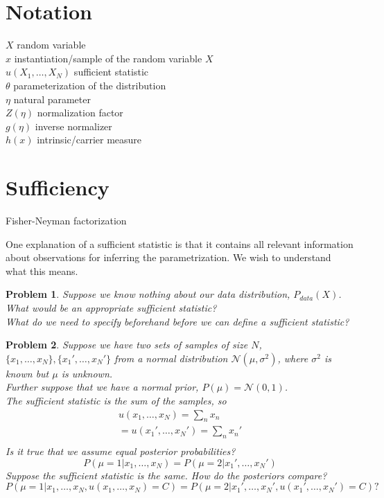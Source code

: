 \documentclass[a4paper]{article}
\newtheorem{problem}{Problem}[section]
\begin{document}
\section{Notation}

$X$ random variable \\ 
$x$ instantiation/sample of the random variable $X$ \\
$u(X_1, \ldots, X_N)$ sufficient statistic \\
$\theta$ parameterization of the distribution \\
$\eta$ natural parameter \\
$Z(\eta)$ normalization factor \\
$g(\eta)$ inverse normalizer \\
$h(x)$ intrinsic/carrier measure

\section{Sufficiency}

Fisher-Neyman factorization

One explanation of a sufficient statistic is that it contains all relevant information about observations for inferring the parametrization.  We wish to understand what this means.

\begin{problem}
Suppose we know nothing about our data distribution, $P_{data}(X)$.  What would be an appropriate sufficient statistic?  \\
What do we need to specify beforehand before we can define a sufficient statistic?  
\end{problem}

\begin{problem}
  Suppose we have two sets of samples of size $N$, $\{x_1,\ldots,x_N\},\{x_1',\ldots,x_N'\}$ from a normal distribution $\mathcal{N}( \mu, \sigma^2 )$, where $\sigma^2$ is known but $\mu$ is unknown.  \\
  Further suppose that we have a normal prior, $P(\mu) = \mathcal{N}(0,1)$.  \\
  The sufficient statistic is the sum of the samples, so 
\begin{equation}
  \begin{split}
    u(x_1,\ldots,x_N) = \sum_n x_n \\
    = u(x_1',\ldots,x_N') = \sum_n x_n' \\
  \end{split}
  \label{}
\end{equation}
Is it true that we assume equal posterior probabilities?
\begin{equation}
  P( \mu = 1 \vert x_1,\ldots,x_N ) = P( \mu = 2 \vert x_1', \ldots, x_N')
  \label{}
\end{equation}
Suppose the sufficient statistic is the same.  How do the posteriors compare?
\begin{equation}
  P( \mu = 1 \vert x_1,\ldots,x_N, u(x_1,\ldots,x_N) = C ) = P( \mu = 2 \vert x_1',\ldots,x_N', u(x_1',\ldots,x_N') = C ) ?
  \label{}
\end{equation}

\end{problem}
\end{document}
